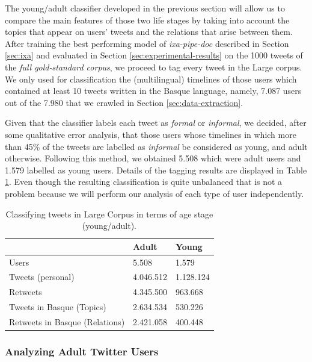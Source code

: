 \documentclass[information,article,submit,moreauthors,pdftex,10pt,a4paper]{Definitions/mdpi}
\begin{document}
The young/adult classifier developed in the previous section will allow us to compare the main features of those two life stages by taking into account the topics that appear on users' tweets and the relations that arise between them. After training the best performing model of \emph{ixa-pipe-doc} described in Section \ref{sec:ixa} and evaluated in Section \ref{sec:experimental-results} on the 1000 tweets of the \emph{full gold-standard corpus}, we proceed to tag every tweet in the Large corpus. We only used for classification the (multilingual) timelines of those users which contained at least 10 tweets written in the Basque language, namely, 7.087 users out of the 7.980 that we crawled in Section \ref{sec:data-extraction}.

Given that the classifier labels each tweet as \emph{formal} or \emph{informal}, we decided, after some qualitative error analysis, that those users whose timelines in which more than 45\% of the tweets are labelled as \emph{informal} be considered as young, and adult otherwise. Following this method, we obtained 5.508 which were adult users and 1.579 labelled as young users. Details of the tagging results are displayed in Table \ref{tab:largecorpusdata}. Even though the resulting classification is quite unbalanced that is not a problem because we will perform our analysis of each type of user independently.

\begin{table}[H]
  \centering
  \begin{tabular}{lll} \hline
     & Adult & Young \\ \hline \hline
    Users & 5.508 & 1.579 \\
    Tweets (personal) & 4.046.512 & 1.128.124 \\
    Retweets  & 4.345.500 & 963.668 \\
    Tweets in Basque (Topics) & 2.634.534 & 530.226 \\
    Retweets in Basque (Relations) & 2.421.058 & 400.448 \\ \hline
  \end{tabular}
  \caption{Classifying tweets in Large Corpus in terms of age stage (young/adult).}
  \label{tab:largecorpusdata}
\end{table}


\subsubsection{Analyzing Adult Twitter Users}
\end{document}
